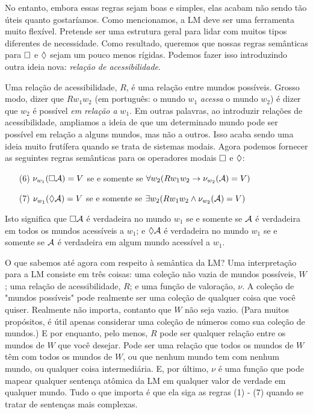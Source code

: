 No entanto, embora essas regras sejam boas e simples, elas acabam não sendo tão úteis quanto gostaríamos. Como mencionamos, a LM deve ser uma ferramenta muito flexível. Pretende ser uma estrutura geral para lidar com muitos tipos diferentes de necessidade. Como resultado, queremos que nossas regras semânticas para  $\Box$ e $\Diamond$ sejam um pouco menos rígidas. Podemos fazer isso introduzindo outra ideia nova: \emph{relação de acessibilidade}.

Uma relação de acessibilidade, $R$, é uma relação entre mundos possíveis. Grosso modo, dizer que $Rw_1w_2$ (em português: o mundo $w_1$ \emph{acessa} o mundo $w_2$) é dizer que $w_2$ é possível  \emph{em relação a} $w_1$. Em outras palavras, ao introduzir relações de acessibilidade, ampliamos a ideia de que um determinado mundo pode ser possível em relação a alguns mundos, mas não a outros. Isso acaba sendo uma ideia muito frutífera quando se trata de sistemas modais. Agora podemos fornecer as seguintes regras semânticas para os operadores modais $\Box$ e $\Diamond$:


\begin{itemize}
	\item[(6)]$\nu_{w_1}(\Box \mathcal{A})=V$ se e somente se  $\forall w_2 (Rw_1w_2\rightarrow \nu_{w_2}(\mathcal{A})=V)$
	\item[(7)]$\nu_{w_1}(\Diamond \mathcal{A})=V$ se e somente se  $\exists w_2 (Rw_1w_2\wedge \nu_{w_2}(\mathcal{A})=V)$
\end{itemize}
Isto significa que $\Box\mathcal{A}$ é verdadeira no mundo  $w_1$ se e somente se $\mathcal{A}$ é verdadeira em todos os mundos acessíveis a  $w_1$; e $\Diamond\mathcal{A}$ é verdadeira no mundo  $w_1$ se e somente se $\mathcal{A}$ é verdadeira em algum mundo acessível a  $w_1$.

O que sabemos até agora com respeito à semântica da LM?  Uma interpretação para a LM consiste em três coisas: uma coleção não vazia de mundos possíveis, $W$; uma relação de acessibilidade, $R$; e uma função de valoração, $\nu$. A coleção de "mundos possíveis" pode realmente ser uma coleção de qualquer coisa que você quiser. Realmente não importa, contanto que $W$ não seja vazio. (Para muitos propósitos, é útil apenas considerar uma coleção de números como sua coleção de mundos.) E por enquanto, pelo menos, $R$ pode ser qualquer relação entre os mundos de $W$ que você desejar. Pode ser uma relação que todos os mundos de $W$ têm com todos os mundos de $W$, ou que nenhum mundo tem com nenhum mundo, ou qualquer coisa intermediária. E, por último, $\nu$ é uma função que pode mapear qualquer sentença atômica da LM em qualquer valor de verdade em qualquer mundo. Tudo o que importa é que ela siga as regras (1) - (7) quando se tratar de sentenças mais complexas.

